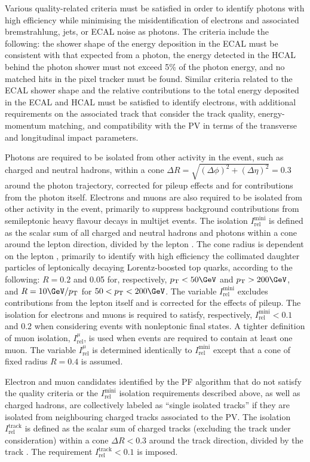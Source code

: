 Various quality-related criteria must be satisfied in order to
identify photons with high efficiency while minimising the
misidentification of electrons and associated bremstrahlung, jets,
or ECAL noise as photons. The criteria include the following: the
shower shape of the energy deposition in the ECAL must be consistent
with that expected from a photon, the energy detected in the HCAL
behind the photon shower must not exceed 5\% of the photon energy, and
no matched hits in the pixel tracker must be found. Similar criteria
related to the ECAL shower shape and the relative contributions to the
total energy deposited in the ECAL and HCAL must be satisfied to
identify electrons, with additional requirements on the associated
track that consider the track quality, energy-momentum matching, and
compatibility with the PV in terms of the transverse and longitudinal
impact parameters.

Photons are required to be isolated from other activity in the event,
such as charged and neutral hadrons, within a cone $\Delta R =
\sqrt{(\Delta\phi)^2 + (\Delta\eta)^2} = 0.3$ around the photon
trajectory, corrected for pileup effects and for contributions from
the photon itself. Electrons and muons are also required to be
isolated from other activity in the event, primarily to suppress
background contributions from semileptonic heavy flavour decays in
multijet events. The isolation $I^\text{mini}_\text{rel}$ is defined
as the scalar \Pt sum of all charged and neutral hadrons and photons
within a cone around the lepton direction, divided by the lepton
\Pt. The cone radius is dependent on the lepton \Pt, primarily to
identify with high efficiency the collimated daughter particles of
leptonically decaying Lorentz-boosted top quarks, according to the
following: $R = 0.2$ and 0.05 for, respectively, $\Pt < 50\GeV$ and
$\Pt > 200\GeV$, and $R = 10\GeV / \Pt$ for $50 < \Pt < 200\GeV$. The
variable $I^\text{mini}_\text{rel}$ excludes contributions from the
lepton itself and is corrected for the effects of pileup. The
isolation for electrons and muons is required to satisfy,
respectively, $I^\text{mini}_\text{rel} < 0.1$ and 0.2 when
considering events with nonleptonic final states. A tighter definition
of muon isolation, $I^{\mu}_\text{rel}$, is used when events are
required to contain at least one muon. The variable
$I^{\mu}_\text{rel}$ is determined identically to
$I^\text{mini}_\text{rel}$ except that a cone of fixed radius $R =
0.4$ is assumed.

Electron and muon candidates identified by the PF algorithm that do
not satisfy the quality criteria or the $I^\text{mini}_\text{rel}$
isolation requirements described above, as well as charged hadrons,
are collectively labeled as ``single isolated tracks'' if they are
isolated from neighbouring charged tracks associated to the PV. The
isolation $I^\text{track}_\text{rel}$ is defined as the scalar \Pt sum
of charged tracks (excluding the track under consideration) within a
cone $\Delta R < 0.3$ around the track direction, divided by the track
\Pt. The requirement $I^\text{track}_\text{rel} < 0.1$ is imposed.

